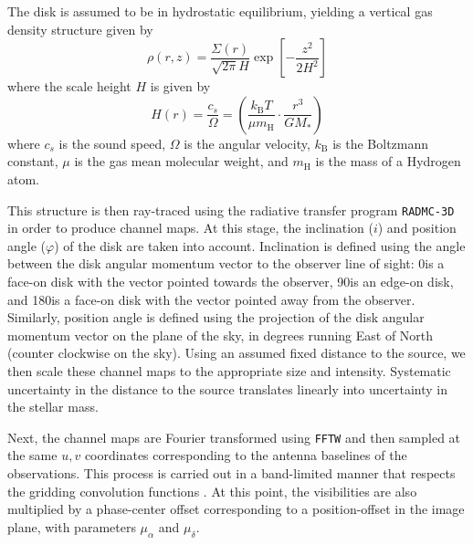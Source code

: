 \documentclass{aastex6}
\begin{document}
The disk is assumed to be in hydrostatic equilibrium, yielding a vertical gas density structure given by
\begin{equation}
\rho(r, z) = \frac{\Sigma(r)}{\sqrt{2 \pi} H} \exp \left [- \frac{z^2}{2 H^2} \right]
\end{equation}
where the scale height $H$ is given by
\begin{equation}
	H(r) = \frac{c_s}{\Omega} = \left (\frac{k_\mathrm{B} T}{\mu m_\mathrm{H}} \cdot \frac{r^3}{G M_\ast} \right)
\end{equation}
where $c_s$ is the sound speed, $\Omega$ is the angular velocity, $k_\mathrm{B}$ is the Boltzmann constant, $\mu$ is the gas mean molecular weight, and $m_\mathrm{H}$ is the mass of a Hydrogen atom.

This structure is then ray-traced using the radiative transfer program \texttt{RADMC-3D} in order to produce channel maps. At this stage, the inclination ($i$) and position angle ($\varphi$) of the disk are taken into account. Inclination is defined using the angle between the disk angular momentum vector to the observer line of sight: 0\degr is a face-on disk with the vector pointed towards the observer, 90\degr is an edge-on disk, and 180\degr is a face-on disk with the vector pointed away from the observer. Similarly, position angle is defined using the projection of the disk angular momentum vector on the plane of the sky, in degrees running East of North (counter clockwise on the sky). Using an assumed fixed distance to the source, we then scale these channel maps to the appropriate size and intensity. Systematic uncertainty in the distance to the source translates linearly into uncertainty in the stellar mass.

Next, the channel maps are Fourier transformed using \texttt{FFTW} \citep{fftw} and then sampled at the same $u, v$ coordinates corresponding to the antenna baselines of the observations. This process is carried out in a band-limited manner that respects the gridding convolution functions \citep{schwab84}. At this point, the visibilities are also multiplied by a phase-center offset corresponding to a position-offset in the image plane, with parameters $\mu_\alpha$ and $\mu_\delta$.
\end{document}
